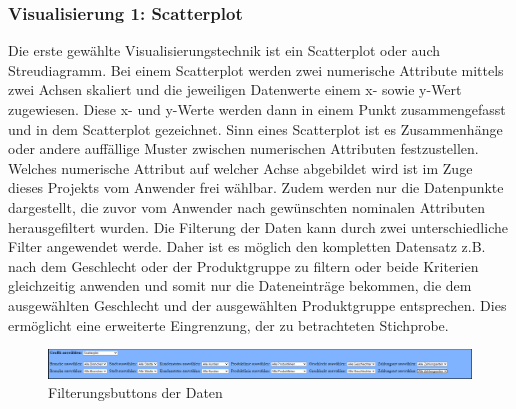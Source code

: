 \documentclass[usegeometry=true]{scrartcl}
\begin{document}
\subsubsection{Visualisierung 1: Scatterplot}\label{Visualisierung1}
Die erste gewählte Visualisierungstechnik ist ein Scatterplot oder auch Streudiagramm. Bei einem Scatterplot werden zwei numerische Attribute mittels zwei Achsen skaliert und die
jeweiligen Datenwerte einem x- sowie y-Wert zugewiesen. Diese x- und y-Werte werden dann in einem Punkt zusammengefasst und in dem Scatterplot gezeichnet. Sinn eines Scatterplot
ist es Zusammenhänge oder andere auffällige Muster zwischen numerischen Attributen festzustellen. \cite[103]{Friendly2005} Welches numerische Attribut auf welcher Achse
abgebildet wird ist im Zuge dieses Projekts vom Anwender frei wählbar. Zudem werden nur die Datenpunkte dargestellt, die zuvor vom Anwender nach gewünschten nominalen
Attributen herausgefiltert wurden. Die Filterung der Daten kann durch zwei unterschiedliche Filter angewendet werde. Daher ist es möglich den kompletten Datensatz z.B. nach
dem Geschlecht oder der Produktgruppe zu filtern oder beide Kriterien gleichzeitig anwenden und somit nur die Dateneinträge bekommen, die dem ausgewählten Geschlecht und der
ausgewählten Produktgruppe entsprechen. Dies ermöglicht eine erweiterte Eingrenzung, der zu betrachteten Stichprobe. \\
\begin{figure} [H]
	\begin{center}
		\includegraphics[width=16cm]{IMG/Filterung}
		\caption{Filterungsbuttons der Daten}
		\label{fig:Filterungbuttons}
	\end{center}
\end{figure}
\end{document}
